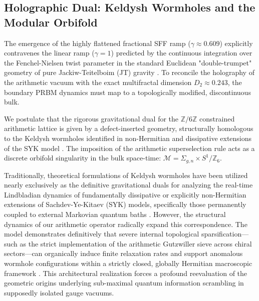 \documentclass[aps,prl,preprint,superscriptaddress,floatfix]{revtex4-2}
\newcommand{\Zmod}{\mathbb{Z}/6\mathbb{Z}}
\begin{document}
\subsection{Holographic Dual: Keldysh Wormholes and the Modular Orbifold}

The emergence of the highly flattened fractional SFF ramp ($\gamma \approx 0.609$) explicitly contravenes the linear ramp ($\gamma = 1$) predicted by the continuous integration over the Fenchel-Nielsen twist parameter in the standard Euclidean "double-trumpet" geometry of pure Jackiw-Teitelboim (JT) gravity \cite{Saad2019, Cotler2017}. To reconcile the holography of the arithmetic vacuum with the exact multifractal dimension $D_2 \approx 0.243$, the boundary PRBM dynamics must map to a topologically modified, discontinuous bulk.

We postulate that the rigorous gravitational dual for the $\Zmod$ constrained arithmetic lattice is given by a defect-inserted geometry, structurally homologous to the Keldysh wormholes identified in non-Hermitian and dissipative extensions of the SYK model \cite{Zheng2023b, GarciaGarcia2023, Arias2024}. The imposition of the arithmetic superselection rule acts as a discrete orbifold singularity in the bulk space-time: $\mathcal{M} = \Sigma_{g,n} \times S^1 / \mathbb{Z}_6$.

Traditionally, theoretical formulations of Keldysh wormholes have been utilized nearly exclusively as the definitive gravitational duals for analyzing the real-time Lindbladian dynamics of fundamentally dissipative or explicitly non-Hermitian extensions of Sachdev-Ye-Kitaev (SYK) models, specifically those permanently coupled to external Markovian quantum baths \cite{GarciaGarcia2023, Zheng2023b}. However, the structural dynamics of our arithmetic operator radically expand this correspondence. The model demonstrates definitively that severe internal topological sparsification—such as the strict implementation of the arithmetic Gutzwiller sieve across chiral sectors—can organically induce finite relaxation rates and support anomalous wormhole configurations within a strictly closed, globally Hermitian macroscopic framework \cite{Bhattacharjee2025}. This architectural realization forces a profound reevaluation of the geometric origins underlying sub-maximal quantum information scrambling in supposedly isolated gauge vacuums.
\end{document}
